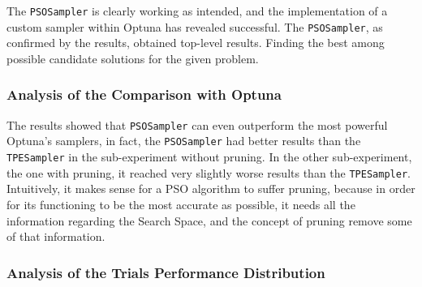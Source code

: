 The \texttt{PSOSampler} is clearly working as intended, and the implementation of a custom sampler within Optuna has revealed successful.
The \texttt{PSOSampler}, as confirmed by the results, obtained top-level results. Finding the best among possible candidate solutions for the given problem.

\subsubsection{Analysis of the Comparison with Optuna}

The results showed that \texttt{PSOSampler} can even outperform the most powerful Optuna's samplers, in fact, the \texttt{PSOSampler} had better results than the \texttt{TPESampler} in the sub-experiment without pruning.
In the other sub-experiment, the one with pruning, it reached very slightly worse results than the \texttt{TPESampler}. Intuitively, it makes sense for a PSO algorithm to suffer pruning, because in order for its functioning to be the most accurate as possible, it needs all the information regarding the Search Space, and the concept of pruning remove some of that information.

\subsubsection{Analysis of the Trials Performance Distribution}

